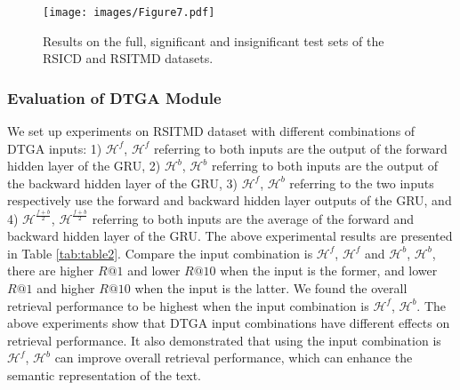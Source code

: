 \documentclass[journal]{IEEEtran}
\begin{document}
\begin{figure*}[t]
  \centering
  \texttt{[image: images/Figure7.pdf]}
  \caption{Results on the full, significant and insignificant test sets of the RSICD and RSITMD datasets.}
  \label{fig:fig11}
\end{figure*}

\subsubsection{Evaluation of DTGA Module}
We set up experiments on RSITMD dataset with different combinations of DTGA inputs: 1) $\bm{\mathcal{H}}^f$, $\bm{\mathcal{H}}^f$ referring to both inputs are the output of the forward hidden layer of the GRU, 2) $\bm{\mathcal{H}}^b$, $\bm{\mathcal{H}}^b$ referring to both inputs are the output of the backward hidden layer of the GRU, 3) $\bm{\mathcal{H}}^f$, $\bm{\mathcal{H}}^b$ referring to the two inputs respectively use the forward and backward hidden layer outputs of the GRU, and 4) $\bm{\mathcal{H}}^{\frac{f+b}{2}}$, $\bm{\mathcal{H}}^{\frac{f+b}{2}}$ referring to both inputs are the average of the forward and backward hidden layer of the GRU. The above experimental results are presented in Table \ref{tab:table2}. Compare the input combination is $\bm{\mathcal{H}}^f$, $\bm{\mathcal{H}}^f$ and $\bm{\mathcal{H}}^b$, $\bm{\mathcal{H}}^b$, there are higher $R@1$ and lower $R@10$ when the input is the former, and lower $R@1$ and higher $R@10$ when the input is the latter. We found the overall retrieval performance to be highest when the input combination  is $\bm{\mathcal{H}}^f$, $\bm{\mathcal{H}}^b$. The above experiments show that DTGA input combinations have different effects on retrieval performance. It also demonstrated that using the input combination is $\bm{\mathcal{H}}^f$, $\bm{\mathcal{H}}^b$ can improve overall retrieval performance, which can enhance the semantic representation of the text.
\end{document}
